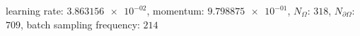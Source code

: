 learning rate: $\num[scientific-notation=true]{3.863156e-02}$, momentum: $\num[scientific-notation=true]{9.798875e-01}$, $N_{\Omega}$: $\num[scientific-notation=false]{318}$, $N_{\partial\Omega}$: $\num[scientific-notation=false]{709}$, batch sampling frequency: $\num[scientific-notation=false]{214}$